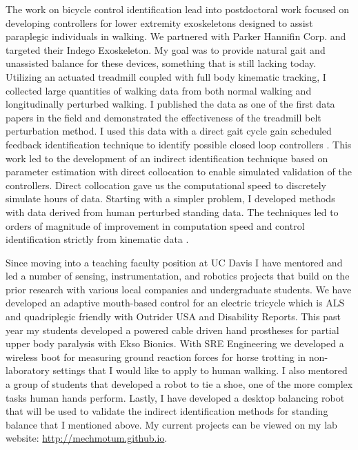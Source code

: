 \documentclass[letter]{article}
\begin{document}
The work on bicycle control identification lead into postdoctoral work focused
on developing controllers for lower extremity exoskeletons designed to assist
paraplegic individuals in walking. We partnered with Parker Hannifin Corp. and
targeted their Indego Exoskeleton. My goal was to provide natural gait and
unassisted balance for these devices, something that is still lacking today.
Utilizing an actuated treadmill coupled with full body kinematic tracking, I
collected large quantities of walking data from both normal walking and
longitudinally perturbed walking. I published the data as one of the first data
papers in the field \cite{Moore2015b} and demonstrated the effectiveness of the
treadmill belt perturbation method. I used this data with a direct gait cycle
gain scheduled feedback identification technique to identify possible closed
loop controllers \cite{Moore2013c,Moore2014a,Moore2014c}. This work led to
the development of an indirect identification technique based on parameter
estimation with direct collocation to enable simulated validation of the
controllers. Direct collocation gave us the computational speed to discretely
simulate hours of data. Starting with a simpler problem, I developed methods
with data derived from human perturbed standing data. The techniques led to
orders of magnitude of improvement in computation speed and control
identification strictly from kinematic data \cite{Moore2014e,Moore2015}.

Since moving into a teaching faculty position at UC Davis I have mentored and
led a number of sensing, instrumentation, and robotics projects that build on
the prior research with various local companies and undergraduate students. We
have developed an adaptive mouth-based control for an electric tricycle which
is ALS and quadriplegic friendly with Outrider USA and Disability Reports. This
past year my students developed a powered cable driven hand prostheses for
partial upper body paralysis with Ekso Bionics. With SRE Engineering we
developed a wireless boot for measuring ground reaction forces for horse
trotting in non-laboratory settings that I would like to apply to human
walking. I also mentored a group of students that developed a robot to tie a
shoe, one of the more complex tasks human hands perform. Lastly, I have
developed a desktop balancing robot that will be used to validate the indirect
identification methods for standing balance that I mentioned above. My current
projects can be viewed on my lab website: \url{http://mechmotum.github.io}.
\end{document}
